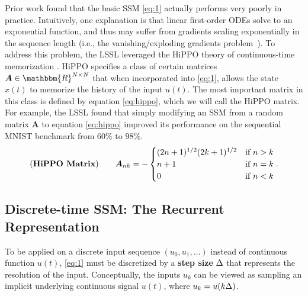Prior work found that the basic SSM \eqref{eq:1} actually performs very poorly in practice.
Intuitively, one explanation is that linear first-order ODEs solve to an exponential function,
and thus may suffer from gradients scaling exponentially in the sequence length (i.e., the vanishing/exploding gradients problem~\citep{pascanu2013difficulty}).
To address this problem, the LSSL leveraged the HiPPO theory of continuous-time memorization \citep{gu2020hippo}.
HiPPO specifies a class of certain matrices \( \bm{A} \in \mathbbm{R}^{N \times N} \) that when incorporated into \eqref{eq:1}, allows the state \( x(t) \) to memorize the history of the input \( u(t) \).
The most important matrix in this class is defined by equation \eqref{eq:hippo},
which we will call the HiPPO matrix. %
For example, the LSSL found that simply modifying an SSM from a random matrix \( \bm{A} \) to equation \eqref{eq:hippo} improved its performance on the sequential MNIST benchmark from \( 60\% \) to \( 98\% \).
\begin{equation}
  \label{eq:hippo}
  (\text{\textbf{HiPPO Matrix}})
  \qquad
  \bm{A}_{nk}
  =
  -
  \begin{cases}
    (2n+1)^{1/2}(2k+1)^{1/2} & \mbox{if } n > k \\
    n+1 & \mbox{if } n = k \\
    0 & \mbox{if } n < k
  \end{cases}
  .
\end{equation}

\subsection{Discrete-time SSM: The Recurrent Representation}
\label{sec:ss-recurrent}

To be applied on a discrete input sequence \( (u_0, u_1, \dots) \) instead of continuous function \( u(t) \),
\eqref{eq:1} must be discretized by a \textbf{step size} \( \Delta \) that represents the resolution of the input.
Conceptually, the inputs \( u_k \) can be viewed as sampling an implicit underlying continuous signal \( u(t) \), where \( u_k = u(k \Delta) \).




